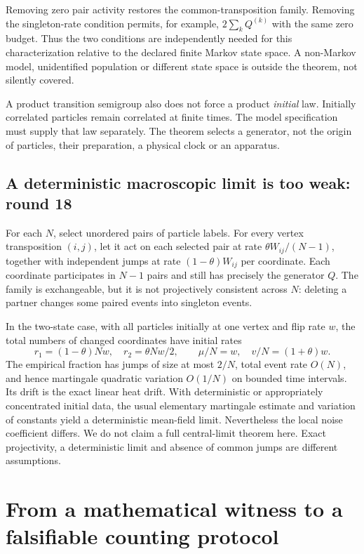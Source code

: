 \documentclass[11pt,a4paper]{article}
\begin{document}
Removing zero pair activity restores the common-transposition family.
Removing the singleton-rate condition permits, for example,
$2\sum_kQ^{(k)}$ with the same zero budget. Thus the two conditions are
independently needed for this characterization relative to the declared
finite Markov state space. A non-Markov model, unidentified population or
different state space is outside the theorem, not silently covered.

A product transition semigroup also does not force a product \emph{initial}
law. Initially correlated particles remain correlated at finite times.
The model specification must supply that law separately. The theorem
selects a generator, not the origin of particles, their preparation, a
physical clock or an apparatus.

\subsection{A deterministic macroscopic limit is too weak: round 18}

For each $N$, select unordered pairs of particle labels. For every vertex
transposition $(i,j)$, let it act on each selected pair at rate
$\theta W_{ij}/(N-1)$, together with independent jumps at rate
$(1-\theta)W_{ij}$ per coordinate. Each coordinate participates in $N-1$
pairs and still has precisely the generator $Q$. The family is exchangeable,
but it is not projectively consistent across $N$: deleting a partner
changes some paired events into singleton events.

In the two-state case, with all particles initially at one vertex and flip
rate $w$, the total numbers of changed coordinates have initial rates
\[
 r_1=(1-\theta)Nw,\quad r_2=\theta Nw/2,
 \qquad \mu/N=w,\quad v/N=(1+\theta)w.
\]
The empirical fraction has jumps of size at most $2/N$, total event rate
$O(N)$, and hence martingale quadratic variation $O(1/N)$ on bounded time
intervals. Its drift is the exact linear heat drift. With deterministic or
appropriately concentrated initial data, the usual elementary martingale
estimate and variation of constants yield a deterministic mean-field limit.
Nevertheless the local noise coefficient differs. We do not claim a full
central-limit theorem here. Exact projectivity, a deterministic limit and
absence of common jumps are different assumptions.

\section{From a mathematical witness to a falsifiable counting protocol}
\label{sec:detector}
\end{document}
